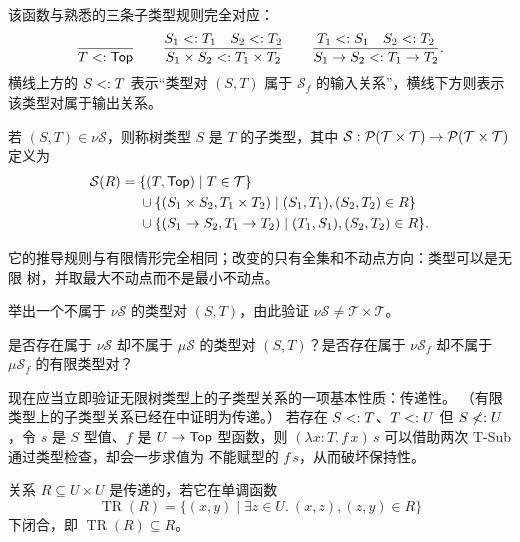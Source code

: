该函数与熟悉的三条子类型规则完全对应：
\[
\frac{}{T\mathrel{<:}\mathsf{Top}}
\qquad
\frac{S_1\mathrel{<:} T_1\quad S_2\mathrel{<:} T_2}
     {S_1\times S_2\mathrel{<:} T_1\times T_2}
\qquad
\frac{T_1\mathrel{<:} S_1\quad S_2\mathrel{<:} T_2}
     {S_1\to S_2\mathrel{<:} T_1\to T_2}.
\]
横线上方的 \(S\mathrel{<:} T\) 表示“类型对 \((S,T)\) 属于
\(\mathcal S_f\) 的输入关系”，横线下方则表示该类型对属于输出关系。

\begin{definition}[无限子类型关系]
\label{def:21.3.2}
若 \((S,T)\in\nu\mathcal S\)，则称树类型 \(S\) 是 \(T\) 的子类型，其中
\(\mathcal S:\mathcal{P}(\mathcal T\times\mathcal T)
\to\mathcal{P}(\mathcal T\times\mathcal T)\) 定义为
\[
\begin{aligned}
\mathcal S(R)={}&\{(T,\mathsf{Top})\mid T\in\mathcal T\}\\
&\cup\{(S_1\times S_2,T_1\times T_2)
          \mid (S_1,T_1),(S_2,T_2)\in R\}\\
&\cup\{(S_1\to S_2,T_1\to T_2)
          \mid (T_1,S_1),(S_2,T_2)\in R\}.
\end{aligned}
\]
\end{definition}

它的推导规则与有限情形完全相同；改变的只有全集和不动点方向：类型可以是无限
树，并取最大不动点而不是最小不动点。

\begin{exercise}[\(\star\)]
\label{ex:21.3.3}
举出一个不属于 \(\nu\mathcal S\) 的类型对 \((S,T)\)，由此验证
\(\nu\mathcal S\ne\mathcal T\times\mathcal T\)。
\end{exercise}

\begin{exercise}[\(\star\)]
\label{ex:21.3.4}
是否存在属于 \(\nu\mathcal S\) 却不属于 \(\mu\mathcal S\) 的类型对
\((S,T)\)？是否存在属于 \(\nu\mathcal S_f\) 却不属于
\(\mu\mathcal S_f\) 的有限类型对？
\end{exercise}

现在应当立即验证无限树类型上的子类型关系的一项基本性质：传递性。
（有限类型上的子类型关系已经在中证明为传递。）
若存在
\(S\mathrel{<:} T\)、\(T\mathrel{<:} U\) 但 \(S\not\mathrel{<:} U\)，令 \(s\) 是
\(S\) 型值、\(f\) 是 \(U\to\mathsf{Top}\) 型函数，则
\((\lambda x:T.\,f\,x)\,s\) 可以借助两次 T-Sub 通过类型检查，却会一步求值为
不能赋型的 \(f\,s\)，从而破坏保持性。

\begin{definition}
\label{def:21.3.5}
关系 \(R\subseteq U\times U\) 是传递的，若它在单调函数
\[
\operatorname{TR}(R)=
\{(x,y)\mid \exists z\in U.\ (x,z),(z,y)\in R\}
\]
下闭合，即 \(\operatorname{TR}(R)\subseteq R\)。
\end{definition}

